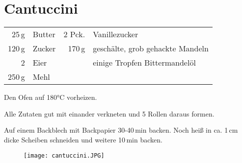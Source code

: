 \section*{Cantuccini}
\begin{centering}

\end{centering}
\begin{table}[H]
\centering
\begin{tabular*}{1\textwidth}{rlrl}
25\,g & Butter &2 Pck. & Vanillezucker \\
120\,g & Zucker & 170\,g & geschälte, grob gehackte Mandeln \\
2 & Eier & & einige Tropfen Bittermandelöl \\
250\,g & Mehl & & \\
\end{tabular*}
\end{table}
\begin{Notes}
\item Den Ofen auf 180°C vorheizen.
\item Alle Zutaten gut mit einander verkneten und 5 Rollen daraus formen.
\item Auf einem Backblech mit  Backpapier 30-40\,min backen. Noch heiß in ca. 1\,cm dicke Scheiben schneiden und weitere 10\,min backen.
\end{Notes}
\begin{figure}[H]
  \centering
  \texttt{[image: cantuccini.JPG]}
\end{figure}
\newpage

